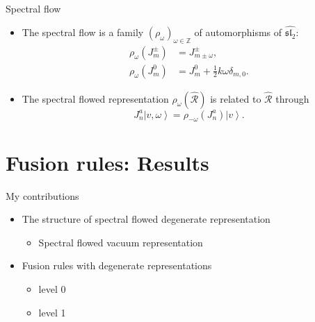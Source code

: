 \documentclass{beamer}
\begin{document}
\begin{frame}{Spectral flow}
  \begin{itemize}
    \item The spectral flow is a family $(\rho_{\omega})_{\omega \in \mathbb{Z}}$ of automorphisms of $\widehat{\mathfrak{sl}_{2}}$: 
      \begin{equation*}
          \begin{aligned}
              \rho_{\omega}(J^{\pm}_{m}) & = J^{\pm}_{m \pm \omega},\\
              \rho_{\omega}(J^{0}_{m}) & = J^{0}_{m} + \frac{1}{2} k \omega \delta_{m,0}.
          \end{aligned}
      \end{equation*}
    \item The spectral flowed representation $\rho_{\omega}\left(\widehat{\mathcal{R}}\right)$ is related to
     $\widehat{\mathcal{R}}$ through
     \begin{equation*}
        J^{a}_{n} \left|v, \omega \right\rangle = \rho_{-\omega}\left(J^{a}_{n}\right) \left|v \right\rangle.
     \end{equation*}
  \end{itemize}
\end{frame}

\section{Fusion rules: Results}

\begin{frame}{My contributions}
  \begin{itemize}
    \item The structure of spectral flowed degenerate representation
        \begin{itemize}
          \item Spectral flowed vacuum representation
        \end{itemize}
    \item Fusion rules with degenerate representations
        \begin{itemize}
          \item level 0 
          \item level 1 
        \end{itemize}
  \end{itemize}
\end{frame}
\end{document}

